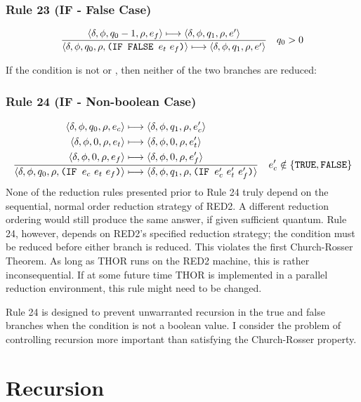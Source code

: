 \subsubsection*{Rule 23 (IF - False Case)}
\[
\frac{
\langle \delta,\phi,q_0-1,\rho,e_f\rangle\longmapsto
\langle \delta,\phi,q_1,\rho,e'\rangle
}{
\langle \delta,\phi,q_0,\rho,\texttt{(IF FALSE }e_t\ e_f\texttt{)}\rangle\longmapsto
\langle \delta,\phi,q_1,\rho,e'\rangle
}
\quad q_0>0
\]

If the condition is not  or , then neither of the two
branches are reduced:

\subsubsection*{Rule 24 (IF - Non-boolean Case)}
\[
\resizebox{\textwidth}{!}{$\displaystyle
\frac{
\begin{gathered}
\cfg{\delta}{\phi}{q_0}{\rho}{e_c}\redsto
\cfg{\delta}{\phi}{q_1}{\rho}{e'_c}\\
\cfg{\delta}{\phi}{0}{\rho}{e_t}\redsto
\cfg{\delta}{\phi}{0}{\rho}{e'_t}\\
\cfg{\delta}{\phi}{0}{\rho}{e_f}\redsto
\cfg{\delta}{\phi}{0}{\rho}{e'_f}
\end{gathered}
}{
\cfg{\delta}{\phi}{q_0}{\rho}{\THOR{(IF }e_c\ e_t\ e_f\THOR{)}}\redsto
\cfg{\delta}{\phi}{q_1}{\rho}{\THOR{(IF }e'_c\ e'_t\ e'_f\THOR{)}}
}
\quad e'_c\notin\{\THOR{TRUE},\THOR{FALSE}\}
$}
\]
None of the reduction rules presented prior to Rule 24 truly depend on the
sequential, normal order reduction strategy of RED2. A different reduction
ordering would still produce the same answer, if given sufficient quantum. Rule
24, however, depends on RED2's specified reduction strategy; the condition must
be reduced before either branch is reduced. This violates the first
Church-Rosser Theorem. As long as THOR runs on the RED2 machine, this is rather
inconsequential. If at some future time THOR is implemented in a parallel
reduction environment, this rule might need to be changed.

Rule 24 is designed to prevent unwarranted recursion in the true and false
branches when the condition is not a boolean value. I consider the problem of
controlling recursion more important than satisfying the Church-Rosser property.

\section{Recursion}

